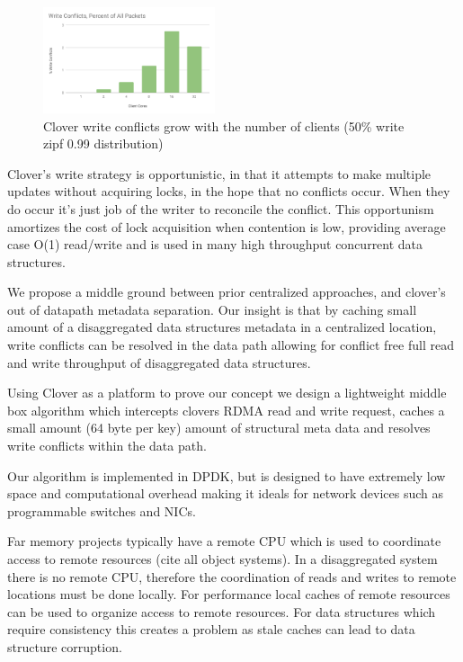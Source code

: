 \begin{figure}
    \includegraphics[width=0.45\textwidth]{fig/write_conflicts.pdf}
    \caption{Clover write conflicts grow with the number of clients
    (50\% write zipf 0.99 distribution)}
    \label{fig:conflicts}
\end{figure}


Clover's write strategy is opportunistic, in that it attempts to make
multiple updates without acquiring locks, in the hope that no conflicts
occur. When they do occur it's just job of the writer to reconcile the
conflict. This opportunism amortizes the cost of lock acquisition when
contention is low, providing average case O(1) read/write and is used
in many high throughput concurrent data structures.


We propose a middle ground between prior centralized approaches, and
clover's out of datapath metadata separation. Our insight is that by
caching small amount of a disaggregated data structures metadata in a
centralized location, write conflicts can be resolved in the data path
allowing for conflict free full read and write throughput of
disaggregated data structures.

Using Clover as a platform to prove our concept we design a
lightweight middle box algorithm which intercepts clovers RDMA read
and write request, caches a small amount (64 byte per key) amount of
structural meta data and resolves write conflicts within the data
path. 

Our algorithm is implemented in DPDK, but is designed to have
extremely low space and computational overhead making it ideals for
network devices such as programmable switches and NICs.



\pagebreak


Far memory projects typically have a remote CPU which is used to
coordinate access to remote resources (cite all object systems). In a
disaggregated system there is no remote CPU, therefore the coordination
of reads and writes to remote locations must be done locally. For
performance local caches of remote resources can be used to organize
access to remote resources. For data structures which require
consistency this creates a problem as stale caches can lead to data
structure corruption.

